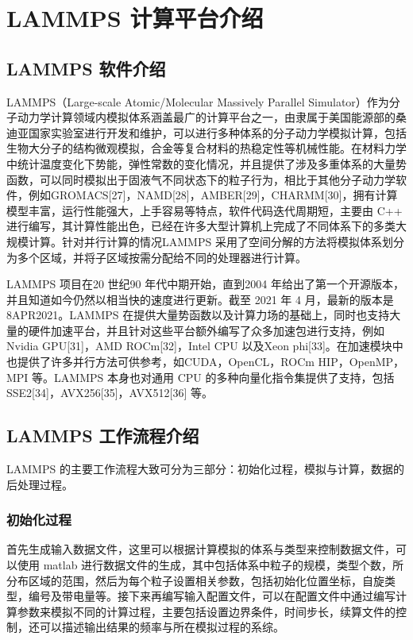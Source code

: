 \section{LAMMPS 计算平台介绍}
\subsection{LAMMPS 软件介绍}
LAMMPS（Large-scale Atomic/Molecular Massively Parallel Simulator）作为分子动力学计算领域内模拟体系涵盖最广的计算平台之一，由隶属于美国能源部的桑迪亚国家实验室进行开发和维护，可以进行多种体系的分子动力学模拟计算，包括生物大分子的结构微观模拟，合金等复合材料的热稳定性等机械性能。在材料力学中统计温度变化下势能，弹性常数的变化情况，并且提供了涉及多重体系的大量势函数，可以同时模拟出于固液气不同状态下的粒子行为，相比于其他分子动力学软件，例如GROMACS[27]，NAMD[28]，AMBER[29]，CHARMM[30]，拥有计算模型丰富，运行性能强大，上手容易等特点，软件代码迭代周期短，主要由 C++ 进行编写，其计算性能出色，已经在许多大型计算机上完成了不同体系下的多类大规模计算。针对并行计算的情况LAMMPS 采用了空间分解的方法将模拟体系划分为多个区域，并将子区域按需分配给不同的处理器进行计算。

LAMMPS 项目在20 世纪90 年代中期开始，直到2004 年给出了第一个开源版本，并且知道如今仍然以相当快的速度进行更新。截至 2021 年 4 月，最新的版本是8APR2021。LAMMPS 在提供大量势函数以及计算力场的基础上，同时也支持大量的硬件加速平台，并且针对这些平台额外编写了众多加速包进行支持，例如Nvidia GPU[31]，AMD ROCm[32]，Intel CPU 以及Xeon phi[33]。在加速模块中也提供了许多并行方法可供参考，如CUDA，OpenCL，ROCm HIP，OpenMP， MPI 等。LAMMPS 本身也对通用 CPU 的多种向量化指令集提供了支持，包括SSE2[34]，AVX256[35]，AVX512[36] 等。

\subsection{LAMMPS 工作流程介绍}
LAMMPS 的主要工作流程大致可分为三部分：初始化过程，模拟与计算，数据的后处理过程。

\subsubsection{初始化过程}
首先生成输入数据文件，这里可以根据计算模拟的体系与类型来控制数据文件，可以使用 matlab 进行数据文件的生成，其中包括体系中粒子的规模，类型个数，所分布区域的范围，然后为每个粒子设置相关参数，包括初始化位置坐标，自旋类型，编号及带电量等。接下来再编写输入配置文件，可以在配置文件中通过编写计算参数来模拟不同的计算过程，主要包括设置边界条件，时间步长，续算文件的控制，还可以描述输出结果的频率与所在模拟过程的系综。

